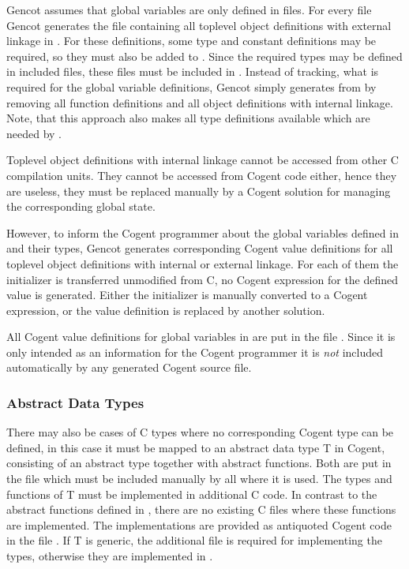 Gencot assumes that global variables are only defined in  files. For every file  Gencot generates
the file  containing all toplevel object definitions with external linkage in . For 
these definitions, some type and constant definitions may be required, so they must also be added to .
Since the required types may be defined in included  files, these files must be included in .
Instead of tracking, what is required for the global variable definitions, Gencot simply generates 
from  by removing all function definitions and all object definitions with internal linkage. Note, that
this approach also makes all type definitions available which are needed by .

Toplevel object definitions with internal linkage cannot be accessed from other C compilation units. They cannot be
accessed from Cogent code either, hence they are useless, they must be replaced manually by a Cogent solution for
managing the corresponding global state. 

However, to inform the Cogent programmer about the global variables defined in  and their types, Gencot 
generates corresponding Cogent value definitions for all toplevel object definitions with internal or external linkage. 
For each of them the initializer is transferred unmodified from C, no Cogent expression for the defined value is 
generated. Either the initializer is manually converted to a Cogent expression, or the value definition is replaced
by another solution. 

All Cogent value definitions for global variables in  are put in the file . Since it
is only intended as an information for the Cogent programmer it is \textit{not} included automatically by any generated
Cogent source file.

\subsubsection{Abstract Data Types}

There may also be cases of C types where no corresponding Cogent type can be defined, in this case it must be mapped to an 
abstract data type T in Cogent, consisting of an abstract type together with abstract functions. Both are put in 
the file  which must be included manually by all  where it is used. The types and 
functions of T must be implemented in additional C code. In contrast to the abstract functions defined in ,
there are no existing C files where these functions are implemented. The implementations are provided as antiquoted Cogent 
code in the file . If T is generic, the additional file  is required for 
implementing the types, otherwise they are implemented in . 

